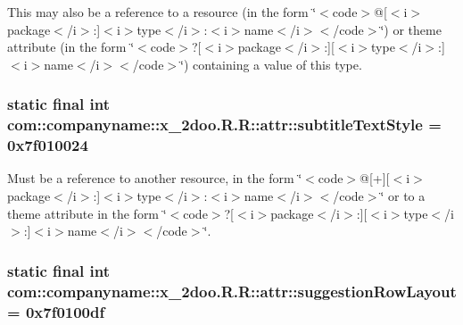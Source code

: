 This may also be a reference to a resource (in the form \char`\"{}$<$code$>$@\mbox{[}$<$i$>$package$<$/i$>$:\mbox{]}$<$i$>$type$<$/i$>$:$<$i$>$name$<$/i$>$$<$/code$>$\char`\"{}) or theme attribute (in the form \char`\"{}$<$code$>$?\mbox{[}$<$i$>$package$<$/i$>$:\mbox{]}\mbox{[}$<$i$>$type$<$/i$>$:\mbox{]}$<$i$>$name$<$/i$>$$<$/code$>$\char`\"{}) containing a value of this type. \hypertarget{classcom_1_1companyname_1_1x__2doo_1_1_r_1_1attr_19f2a7fd83211aa9b099862a6f8def04}{
\subsubsection[{subtitleTextStyle}]{\setlength{\rightskip}{0pt plus 5cm}static final int com::companyname::x\_\-2doo.R.R::attr::subtitleTextStyle = 0x7f010024}}
\label{classcom_1_1companyname_1_1x__2doo_1_1_r_1_1attr_19f2a7fd83211aa9b099862a6f8def04}


Must be a reference to another resource, in the form \char`\"{}$<$code$>$@\mbox{[}+\mbox{]}\mbox{[}$<$i$>$package$<$/i$>$:\mbox{]}$<$i$>$type$<$/i$>$:$<$i$>$name$<$/i$>$$<$/code$>$\char`\"{} or to a theme attribute in the form \char`\"{}$<$code$>$?\mbox{[}$<$i$>$package$<$/i$>$:\mbox{]}\mbox{[}$<$i$>$type$<$/i$>$:\mbox{]}$<$i$>$name$<$/i$>$$<$/code$>$\char`\"{}. \hypertarget{classcom_1_1companyname_1_1x__2doo_1_1_r_1_1attr_f23b775aacd3e60fa26f47ea6dca2853}{
\subsubsection[{suggestionRowLayout}]{\setlength{\rightskip}{0pt plus 5cm}static final int com::companyname::x\_\-2doo.R.R::attr::suggestionRowLayout = 0x7f0100df}}
\label{classcom_1_1companyname_1_1x__2doo_1_1_r_1_1attr_f23b775aacd3e60fa26f47ea6dca2853}


